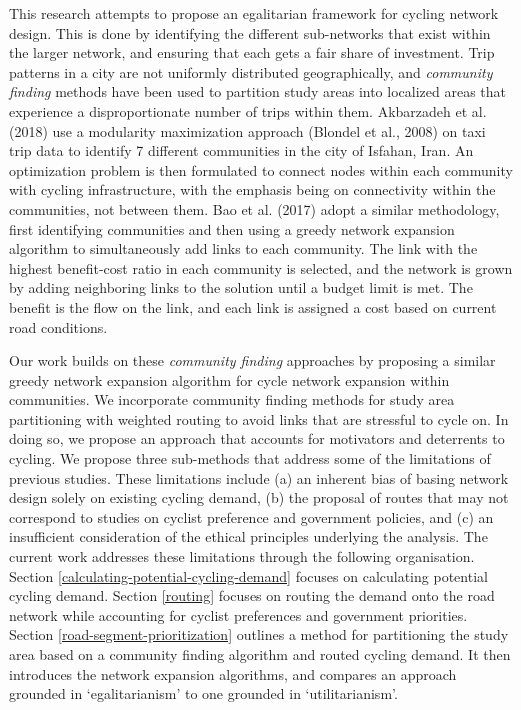 \documentclass[
]{article}
\begin{document}
This research attempts to propose an egalitarian framework for cycling
network design. This is done by identifying the different sub-networks
that exist within the larger network, and ensuring that each gets a fair
share of investment. Trip patterns in a city are not uniformly
distributed geographically, and \emph{community finding} methods have been
used to partition study areas into localized areas that experience a
disproportionate number of trips within them. Akbarzadeh et al. (2018)
use a modularity maximization approach (Blondel et al., 2008) on taxi trip
data to identify 7 different communities in the city of Isfahan, Iran.
An optimization problem is then formulated to connect nodes within each
community with cycling infrastructure, with the emphasis being on
connectivity within the communities, not between them. Bao et al. (2017)
adopt a similar methodology, first identifying communities and then
using a greedy network expansion algorithm to simultaneously add links
to each community. The link with the highest benefit-cost ratio in each
community is selected, and the network is grown by adding neighboring
links to the solution until a budget limit is met. The benefit is the
flow on the link, and each link is assigned a cost based on current road
conditions.

Our work builds on these \emph{community finding} approaches by proposing a
similar greedy network expansion algorithm for cycle network expansion
within communities. We incorporate community finding methods for study
area partitioning with weighted routing to avoid links that are
stressful to cycle on. In doing so, we propose an approach that
accounts for motivators and deterrents to cycling. We propose three
sub-methods that address some of the limitations of previous
studies. These limitations include (a) an inherent bias of basing network
design solely on existing cycling demand, (b) the proposal of routes that may
not correspond to studies on cyclist preference and government policies,
and (c) an insufficient consideration of the ethical principles underlying
the analysis. The current work addresses these limitations through the following organisation. Section \ref{calculating-potential-cycling-demand}
focuses on calculating potential cycling demand. Section \ref{routing}
focuses on routing the demand onto the road network while accounting for
cyclist preferences and government priorities. Section
\ref{road-segment-prioritization} outlines a method for partitioning the
study area based on a community finding algorithm and routed cycling
demand. It then introduces the network expansion algorithms, and compares an approach grounded in
`egalitarianism' to one grounded in `utilitarianism'.
\end{document}
